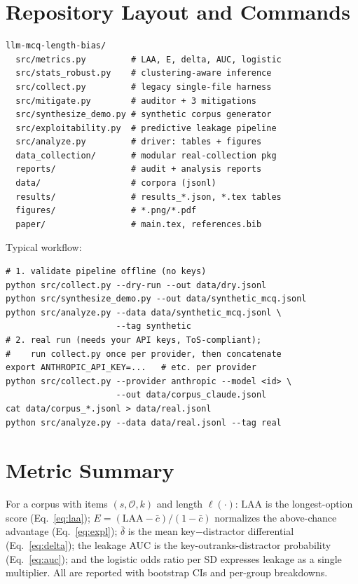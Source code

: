 \documentclass[10pt,twocolumn]{article}
\begin{document}
\section{Repository Layout and Commands}
\label{app:repo}
\small
\begin{verbatim}
llm-mcq-length-bias/
  src/metrics.py         # LAA, E, delta, AUC, logistic
  src/stats_robust.py    # clustering-aware inference
  src/collect.py         # legacy single-file harness
  src/mitigate.py        # auditor + 3 mitigations
  src/synthesize_demo.py # synthetic corpus generator
  src/exploitability.py  # predictive leakage pipeline
  src/analyze.py         # driver: tables + figures
  data_collection/       # modular real-collection pkg
  reports/               # audit + analysis reports
  data/                  # corpora (jsonl)
  results/               # results_*.json, *.tex tables
  figures/               # *.png/*.pdf
  paper/                 # main.tex, references.bib
\end{verbatim}
Typical workflow:
\begin{verbatim}
# 1. validate pipeline offline (no keys)
python src/collect.py --dry-run --out data/dry.jsonl
python src/synthesize_demo.py --out data/synthetic_mcq.jsonl
python src/analyze.py --data data/synthetic_mcq.jsonl \
                      --tag synthetic
# 2. real run (needs your API keys, ToS-compliant);
#    run collect.py once per provider, then concatenate
export ANTHROPIC_API_KEY=...   # etc. per provider
python src/collect.py --provider anthropic --model <id> \
                      --out data/corpus_claude.jsonl
cat data/corpus_*.jsonl > data/real.jsonl
python src/analyze.py --data data/real.jsonl --tag real
\end{verbatim}

\section{Metric Summary}
\label{app:metrics}
\small
For a corpus with items $(s,\mathcal{O},k)$ and length $\ell(\cdot)$:
$\mathrm{LAA}$ is the longest-option score (Eq.~\ref{eq:laa});
$E=(\mathrm{LAA}-\bar c)/(1-\bar c)$ normalizes the above-chance advantage
(Eq.~\ref{eq:expl}); $\bar\delta$ is the mean key$-$distractor differential
(Eq.~\ref{eq:delta}); the leakage AUC is the key-outranks-distractor
probability (Eq.~\ref{eq:auc}); and the logistic odds ratio per SD expresses
leakage as a single multiplier. All are reported with bootstrap CIs and
per-group breakdowns.

\balance


\end{document}
